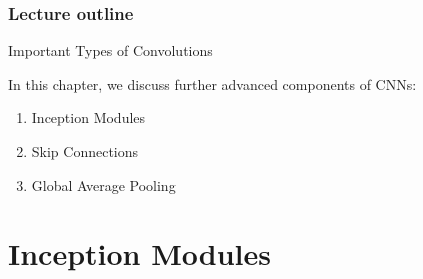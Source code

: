 








\begin{frame}
\frametitle{Lecture outline}
\tableofcontents
\end{frame}

\begin{vbframe}{Important Types of Convolutions}


\vspace*{0.2cm}

In this chapter, we discuss further advanced components of CNNs: 

    \begin{enumerate}
    \item Inception Modules 
    \item Skip Connections 
    \item Global Average Pooling
    \end{enumerate}
\end{vbframe}


\section{Inception Modules}

